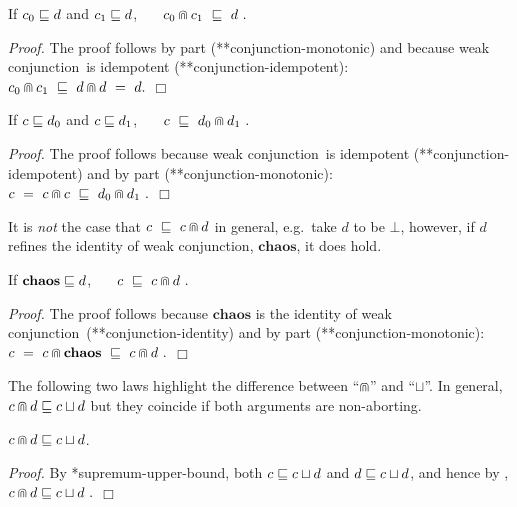 \documentclass[fleqn]{fac}
\makeatletter
\renewenvironment{proof}{\noindent \textit{Proof.}}{\noindent$\Box$\par}
\def\refaxiom{\@ifnextchar*{\@refaxiom}{\@@refaxiom}}
\def\@refaxiom*#1{\ref{axiom-#1}\index{Axiom!#1|LawUse}}
\def\@@refaxiom#1{axiom~(\ref{axiom-#1})\index{Axiom!#1|LawUse}}
\def\refproperty{\@ifnextchar*{\@refproperty}{\@@refproperty}}
\def\@refproperty*#1{\ref{property-#1}\index{Property!#1|LawUse}}
\def\@@refproperty#1{property~(\ref{property-#1})\index{Property!#1|LawUse}}
\newcommand{\angelic}{\mathbin{\sqcup}}
\newcommand{\strictconjunction}{weak conjunction}
\newcommand{\together}{\mathbin{\doublecap}}
\newcommand{\Keyword}[1]{\mathsf{\mathbf{#1}}}
\newcommand{\Abort}{\Keyword{\bot}}
\newcommand{\Chaos}{\Keyword{chaos}}
\makeatother
\begin{document}
\begin{lawx}
If $c_0 \mathrel{\sqsubseteq} d$ and $c_1 \mathrel{\sqsubseteq} d$,~~~
\(
  c_0 \together c_1 ~\refsto~ d~.
\)
\end{lawx}

\begin{proof}
The proof follows by  part (\refproperty*{conjunction-monotonic}) and 
because \strictconjunction\ is idempotent (\refaxiom*{conjunction-idempotent}): \\
\(
    c_0 \together c_1
  ~\refsto~
    d \together d
  ~=~
    d.
\)
\end{proof}


\begin{lawx}
If $c \mathrel{\sqsubseteq} d_0$ and $c \mathrel{\sqsubseteq} d_1$,~~~
\(
  c ~\refsto~ d_0 \together d_1~.
\)
\end{lawx}

\begin{proof}
The proof follows because \strictconjunction\ is idempotent (\refaxiom*{conjunction-idempotent})
and by  part (\refproperty*{conjunction-monotonic}): \\
\(
  c ~=~ c \together c ~\refsto~ d_0 \together d_1~.
\)
\end{proof}
It is \emph{not} the case that $c ~\refsto~ c \together d$ in general, e.g.\ take $d$ to be $\Abort$,
however, if $d$ refines the identity of \strictconjunction, $\Chaos$, it does hold.

\begin{lawx}
If $\Chaos \refsto d$,~~~
\(
  c ~\refsto~ c \together d~.
\)
\end{lawx}

\begin{proof}
The proof follows because $\Chaos$ is the identity of \strictconjunction\ (\refaxiom*{conjunction-identity})
and by  part (\refproperty*{conjunction-monotonic}):~~
\(
  c ~=~ c \together \Chaos ~\refsto~ c \together d~.
\)
\end{proof}
The following two laws highlight the difference between ``$\together$'' and ``$\angelic$''.
In general, $c \together d \refsto c \angelic d$ 
but they coincide if both arguments are non-aborting.

\begin{lawx}
$c \together d \refsto c \angelic d$.
\end{lawx}

\begin{proof}
By \refaxiom{supremum-upper-bound}, both $c \refsto c \angelic d$ and $d \refsto c \angelic d$,
and hence by ,
\(
  c \together d \refsto c \angelic d~.
\)
\end{proof}
\end{document}
